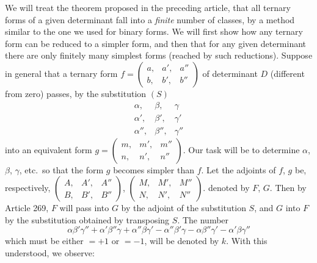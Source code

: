 We will treat the theorem proposed in the preceding article, that all ternary forms of a given determinant fall into a \emph{finite} number of classes, by a method similar to the one we used for binary forms. We will first show how any ternary form can be reduced to a simpler form, and then that for any given determinant there are only finitely many simplest forms (reached by such reductions). Suppose in general that a ternary form \(f=\left(\begin{smallmatrix}a,&a',&a''\\b,&b',&b''\end{smallmatrix}\right)\) of determinant \(D\) (different from zero) passes, by the substitution \((S)\)
\[
\begin{array}{ccc}
\alpha,&\beta,&\gamma\\
\alpha',&\beta',&\gamma'\\
\alpha'',&\beta'',&\gamma''
\end{array}
\]
into an equivalent form \(g=\left(\begin{smallmatrix}m,&m',&m''\\n,&n',&n''\end{smallmatrix}\right)\). Our task will be to determine \(\alpha\), \(\beta\), \(\gamma\), etc.\ so that the form \(g\) becomes simpler than \(f\). Let the adjoints of \(f\), \(g\) be, respectively, \(\left(\begin{smallmatrix}A,&A',&A''\\B,&B',&B''\end{smallmatrix}\right)\), \(\left(\begin{smallmatrix}M,&M',&M''\\N,&N',&N''\end{smallmatrix}\right)\). denoted by \(F\), \(G\). Then by Article 269, \(F\) will pass into \(G\) by the adjoint of the substitution \(S\), and \(G\) into \(F\) by the substitution obtained by transposing \(S\). The number
\[
\alpha\beta'\gamma''+\alpha'\beta''\gamma+\alpha''\beta\gamma'-\alpha''\beta'\gamma-\alpha\beta''\gamma'-\alpha'\beta\gamma''
\]
which must be either \(=+1\) or \(=-1\), will be denoted by \(k\). With this understood, we observe:

